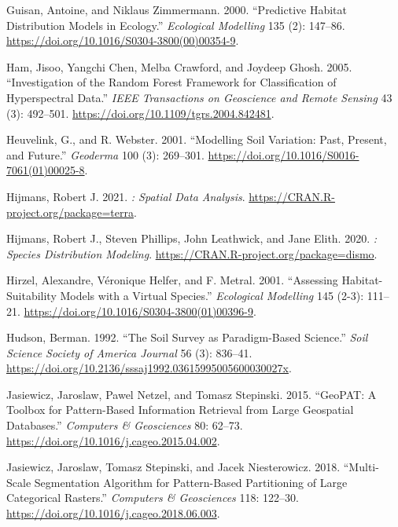 \begin{CSLReferences}{1}{0}
\leavevmode{}%
Guisan, Antoine, and Niklaus Zimmermann. 2000. {``Predictive Habitat Distribution Models in Ecology.''} \emph{Ecological Modelling} 135 (2): 147--86. \url{https://doi.org/10.1016/S0304-3800(00)00354-9}.

\leavevmode{}%
Ham, Jisoo, Yangchi Chen, Melba Crawford, and Joydeep Ghosh. 2005. {``Investigation of the Random Forest Framework for Classification of Hyperspectral Data.''} \emph{IEEE Transactions on Geoscience and Remote Sensing} 43 (3): 492--501. \url{https://doi.org/10.1109/tgrs.2004.842481}.

\leavevmode{}%
Heuvelink, G., and R. Webster. 2001. {``Modelling Soil Variation: Past, Present, and Future.''} \emph{Geoderma} 100 (3): 269--301. \url{https://doi.org/10.1016/S0016-7061(01)00025-8}.

\leavevmode{}%
Hijmans, Robert J. 2021. \emph{: Spatial Data Analysis}. \url{https://CRAN.R-project.org/package=terra}.

\leavevmode{}%
Hijmans, Robert J., Steven Phillips, John Leathwick, and Jane Elith. 2020. \emph{: Species Distribution Modeling}. \url{https://CRAN.R-project.org/package=dismo}.

\leavevmode{}%
Hirzel, Alexandre, Véronique Helfer, and F. Metral. 2001. {``Assessing Habitat-Suitability Models with a Virtual Species.''} \emph{Ecological Modelling} 145 (2-3): 111--21. \url{https://doi.org/10.1016/S0304-3800(01)00396-9}.

\leavevmode{}%
Hudson, Berman. 1992. {``The Soil Survey as Paradigm-Based Science.''} \emph{Soil Science Society of America Journal} 56 (3): 836--41. \url{https://doi.org/10.2136/sssaj1992.03615995005600030027x}.

\leavevmode{}%
Jasiewicz, Jaroslaw, Pawel Netzel, and Tomasz Stepinski. 2015. {``{GeoPAT}: A Toolbox for Pattern-Based Information Retrieval from Large Geospatial Databases.''} \emph{Computers {\&} Geosciences} 80: 62--73. \url{https://doi.org/10.1016/j.cageo.2015.04.002}.

\leavevmode{}%
Jasiewicz, Jaroslaw, Tomasz Stepinski, and Jacek Niesterowicz. 2018. {``Multi-Scale Segmentation Algorithm for Pattern-Based Partitioning of Large Categorical Rasters.''} \emph{Computers {\&} Geosciences} 118: 122--30. \url{https://doi.org/10.1016/j.cageo.2018.06.003}.


\end{CSLReferences}
